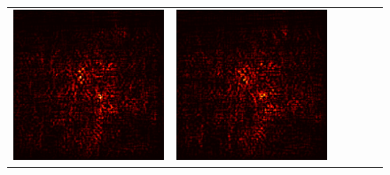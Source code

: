 \documentclass[preprint,12pt]{elsarticle}
\begin{document}
\begin{figure}[p]
\begin{tabular}{cccccc}
  \includegraphics[scale=\scale]{../visualizations/examples/imagenette/resnet18/positive_saliency_map/3.png} & 
  \includegraphics[scale=\scale]{../visualizations/examples/imagenette/resnet18/negative_saliency_map/3.png} & 

\end{tabular}
\end{figure}
\end{document}
